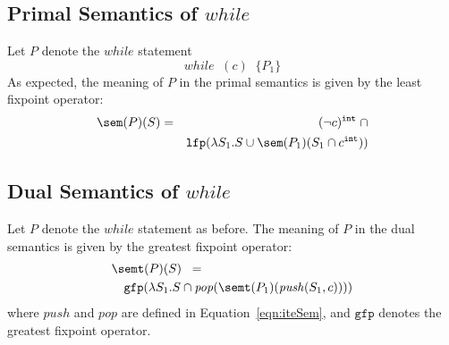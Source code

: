 \documentclass[preprint]{sig-alternate-05-2015}
\def\int{{\tt{int}}}
\def\while{{\mathit{while}}}
\def\lfp{{\mathtt{lfp}}}
\def\gfp{{\mathtt{gfp}}}
\def\push{{\mathit{push}}}
\def\pop{{\mathit{pop}}}
\begin{document}
{\subsection{Primal Semantics of $\while$}

Let $P$ denote the $\while$ statement
$$
\while\;\; (c)\;\;\{ P_1 \}
$$
As expected, the meaning of $P$ in the primal semantics is
given by the least fixpoint operator:
\begin{eqnarray*}
  \sem(P)(S) & = & (\neg c)^\int \; \cap
          \\ & &
  \lfp(\lambda S_1. S\cup \sem(P_1)(S_1\cap c^\int))
\end{eqnarray*}

\subsection{Dual Semantics of $\while$}

Let $P$ denote the $\while$ statement as before.
The meaning of $P$ in the dual semantics is
given by the greatest fixpoint operator:
\begin{eqnarray*}
  \lefteqn{\semt(P)(S) \;\; = } &
\\ &&
  {\gfp(\lambda S_1. S\cap \pop(\semt(P_1)(\push(S_1,c))))}
\end{eqnarray*}
where $\push$ and $\pop$ are defined in Equation~\ref{eqn:iteSem},
and $\gfp$ denotes the greatest fixpoint operator.

}
\end{document}
